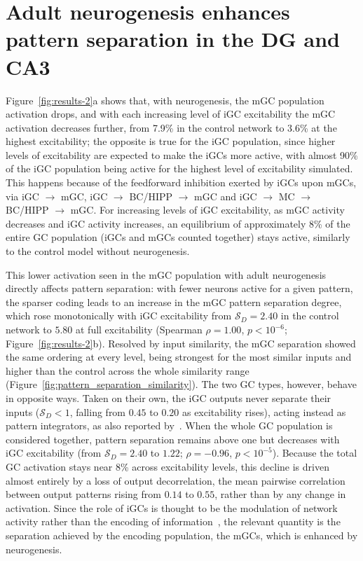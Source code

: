\section{Adult neurogenesis enhances pattern separation in the DG and CA3}\label{sec:res_separation}

Figure~\ref{fig:results-2}a shows that, with neurogenesis, the mGC population activation drops, and with each increasing level of
iGC excitability the mGC activation decreases further, from 7.9\% in the control network to 3.6\% at the highest excitability; the
opposite is true for the iGC population, since higher levels of excitability are expected to make the iGCs more active, with
almost 90\% of the iGC population being active for the highest level of excitability simulated. This happens because of the
feedforward inhibition exerted by iGCs upon mGCs, via iGC $\to$ mGC, iGC $\to$ BC/HIPP $\to$ mGC and iGC $\to$ MC $\to$ BC/HIPP
$\to$ mGC\@. For increasing levels of iGC excitability, as mGC activity decreases and iGC activity increases, an equilibrium of
approximately 8\% of the entire GC population (iGCs and mGCs counted together) stays active, similarly to the control model
without neurogenesis.

This lower activation seen in the mGC population with adult neurogenesis directly affects pattern separation: with fewer neurons
active for a given pattern, the sparser coding leads to an increase in the mGC pattern separation degree, which rose monotonically
with iGC excitability from $\mathcal{S}_D = 2.40$ in the control network to $5.80$ at full excitability (Spearman $\rho = 1.00$,
$p < 10^{-6}$; Figure~\ref{fig:results-2}b). Resolved by input similarity, the mGC separation showed the same ordering at every
level, being strongest for the most similar inputs and higher than the control across the whole similarity range
(Figure~\ref{fig:pattern_separation_similarity}). The two GC
types, however, behave in opposite ways. Taken on their own, the iGC outputs never
separate their inputs ($\mathcal{S}_D < 1$, falling from $0.45$ to $0.20$ as excitability rises), acting instead as pattern
integrators, as also reported by~\textcite{kimEffect2024}. When the whole GC population is considered together, pattern
separation remains above one but decreases with iGC excitability (from $\mathcal{S}_D = 2.40$ to $1.22$; $\rho = -0.96$, $p <
10^{-5}$). Because the total GC activation stays near 8\% across excitability levels, this decline is driven almost
entirely by a loss of output decorrelation, the mean pairwise correlation between output patterns rising from $0.14$ to $0.55$,
rather than by any change in activation. Since the role of iGCs is thought to be the modulation of network activity rather than
the encoding of information~\parencite{mchughAdultborn2022, folszAdultborn2023}, the relevant quantity is the separation achieved
by the encoding population, the mGCs, which is enhanced by neurogenesis.

